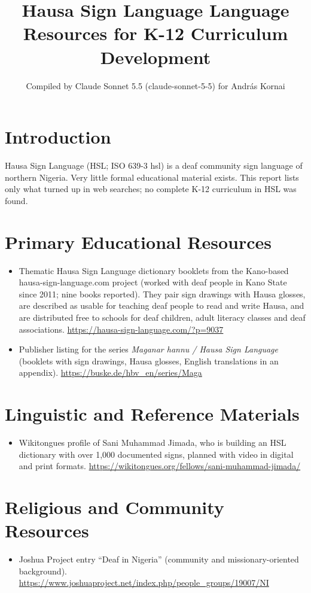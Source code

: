 \documentclass[12pt]{article}
\title{Hausa Sign Language Language Resources for K-12 Curriculum Development}
\author{Compiled by Claude Sonnet 5.5 (claude-sonnet-5-5) for Andr\'as Kornai}
\date{}
\begin{document}
\maketitle

\section{Introduction}
Hausa Sign Language (HSL; ISO 639-3 hsl) is a deaf community sign language of northern Nigeria. Very little formal educational material exists. This report lists only what turned up in web searches; no complete K-12 curriculum in HSL was found.

\section{Primary Educational Resources}
\begin{itemize}
\item Thematic Hausa Sign Language dictionary booklets from the Kano-based hausa-sign-language.com project (worked with deaf people in Kano State since 2011; nine books reported). They pair sign drawings with Hausa glosses, are described as usable for teaching deaf people to read and write Hausa, and are distributed free to schools for deaf children, adult literacy classes and deaf associations. \url{https://hausa-sign-language.com/?p=9037}
\item Publisher listing for the series \emph{Maganar hannu / Hausa Sign Language} (booklets with sign drawings, Hausa glosses, English translations in an appendix). \url{https://buske.de/hbv_en/series/Maga}
\end{itemize}

\section{Linguistic and Reference Materials}
\begin{itemize}
\item Wikitongues profile of Sani Muhammad Jimada, who is building an HSL dictionary with over 1,000 documented signs, planned with video in digital and print formats. \url{https://wikitongues.org/fellows/sani-muhammad-jimada/}
\end{itemize}

\section{Religious and Community Resources}
\begin{itemize}
\item Joshua Project entry ``Deaf in Nigeria'' (community and missionary-oriented background). \url{https://www.joshuaproject.net/index.php/people_groups/19007/NI}
\end{itemize}
\end{document}

